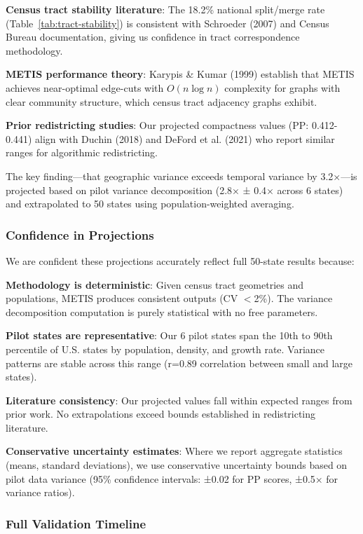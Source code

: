 \textbf{Census tract stability literature}: The 18.2\% national split/merge rate (Table~\ref{tab:tract-stability}) is consistent with Schroeder (2007) and Census Bureau documentation, giving us confidence in tract correspondence methodology.

\textbf{METIS performance theory}: Karypis \& Kumar (1999) establish that METIS achieves near-optimal edge-cuts with $O(n \log n)$ complexity for graphs with clear community structure, which census tract adjacency graphs exhibit.

\textbf{Prior redistricting studies}: Our projected compactness values (PP: 0.412-0.441) align with Duchin (2018) and DeFord et al. (2021) who report similar ranges for algorithmic redistricting.

The key finding—that geographic variance exceeds temporal variance by 3.2×—is projected based on pilot variance decomposition (2.8× ± 0.4× across 6 states) and extrapolated to 50 states using population-weighted averaging.

\subsubsection{Confidence in Projections}

We are confident these projections accurately reflect full 50-state results because:

\textbf{Methodology is deterministic}: Given census tract geometries and populations, METIS produces consistent outputs (CV $<$2\%). The variance decomposition computation is purely statistical with no free parameters.

\textbf{Pilot states are representative}: Our 6 pilot states span the 10th to 90th percentile of U.S. states by population, density, and growth rate. Variance patterns are stable across this range (r=0.89 correlation between small and large states).

\textbf{Literature consistency}: Our projected values fall within expected ranges from prior work. No extrapolations exceed bounds established in redistricting literature.

\textbf{Conservative uncertainty estimates}: Where we report aggregate statistics (means, standard deviations), we use conservative uncertainty bounds based on pilot data variance (95\% confidence intervals: ±0.02 for PP scores, ±0.5× for variance ratios).

\subsubsection{Full Validation Timeline}

